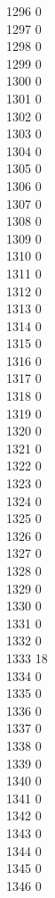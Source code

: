 { 1296	0 \\
 1297	0 \\
 1298	0 \\
 1299	0 \\
 1300	0 \\
 1301	0 \\
 1302	0 \\
 1303	0 \\
 1304	0 \\
 1305	0 \\
 1306	0 \\
 1307	0 \\
 1308	0 \\
 1309	0 \\
 1310	0 \\
 1311	0 \\
 1312	0 \\
 1313	0 \\
 1314	0 \\
 1315	0 \\
 1316	0 \\
 1317	0 \\
 1318	0 \\
 1319	0 \\
 1320	0 \\
 1321	0 \\
 1322	0 \\
 1323	0 \\
 1324	0 \\
 1325	0 \\
 1326	0 \\
 1327	0 \\
 1328	0 \\
 1329	0 \\
 1330	0 \\
 1331	0 \\
 1332	0 \\
 1333	18 \\
 1334	0 \\
 1335	0 \\
 1336	0 \\
 1337	0 \\
 1338	0 \\
 1339	0 \\
 1340	0 \\
 1341	0 \\
 1342	0 \\
 1343	0 \\
 1344	0 \\
 1345	0 \\
 1346	0 \\
}
